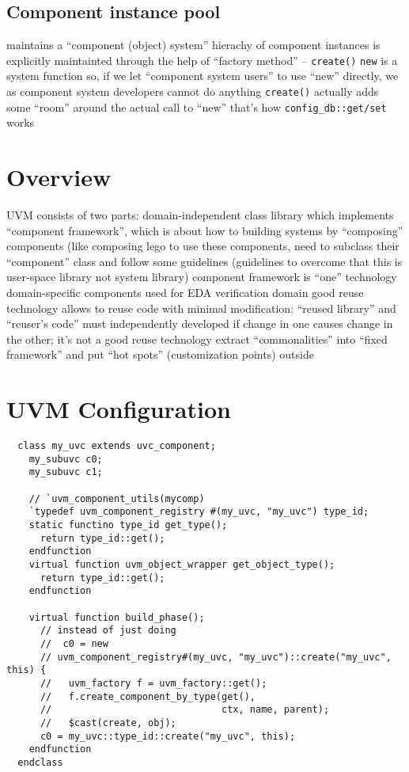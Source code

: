 \documentclass{note}
\begin{document}
\subsection{Component instance pool}
\bit
\w maintains a ``component (object) system''
\w hierachy of component instances is explicitly maintainted through the help
of ``factory method'' -- \verb+create()+
  \bit
  \w \verb+new+ is a system function so, if we let ``component system users''
      to use ``new'' directly, we as component system developers cannot do
      anything
  \w \verb+create()+ actually adds some ``room'' around the actual call to
  ``new'' 
  \w 
  \eit
\w that's how \verb+config_db::get/set+ works
\eit


\section{Overview}
\bit
\w UVM consists of two parts:
  \bit
  \w domain-independent class library which implements ``component
  framework'', which is about how to building systems by ``composing''
  components (like composing lego 
    \bit
    \w to use these components, need to subclass their ``component'' class
      and follow some guidelines (guidelines to overcome that this is
      user-space library not system library)
    \w component framework is ``one''  technology
    \eit
  \w domain-specific components used for EDA verification domain
  \eit
\w {}
  \bit
  \w good reuse technology allows to reuse code with minimal modification:
     ``reused library'' and ``reuser's code'' must independently developed
    \bit
    \w if change in one causes change in the other; it's not a good reuse
    technology 
    \eit
  \w extract ``commonalities'' into ``fixed framework''  and
   put ``hot spots'' (customization points) outside

  \w {}
  \eit
\eit



\section{UVM Configuration}
\begin{verbatim}
  class my_uvc extends uvc_component;
    my_subuvc c0;
    my_subuvc c1;

    // `uvm_component_utils(mycomp)
    `typedef uvm_component_registry #(my_uvc, "my_uvc") type_id;
    static functino type_id get_type();
      return type_id::get();
    endfunction
    virtual function uvm_object_wrapper get_object_type();
      return type_id::get();
    endfunction
    
    virtual function build_phase();
      // instead of just doing
      //  c0 = new
      // uvm_component_registry#(my_uvc, "my_uvc")::create("my_uvc", this) {
      //   uvm_factory f = uvm_factory::get();
      //   f.create_component_by_type(get(), 
      //                              ctx, name, parent);
      //   $cast(create, obj);
      c0 = my_uvc::type_id::create("my_uvc", this);
    endfunction
  endclass  
\end{verbatim}
\end{document}
